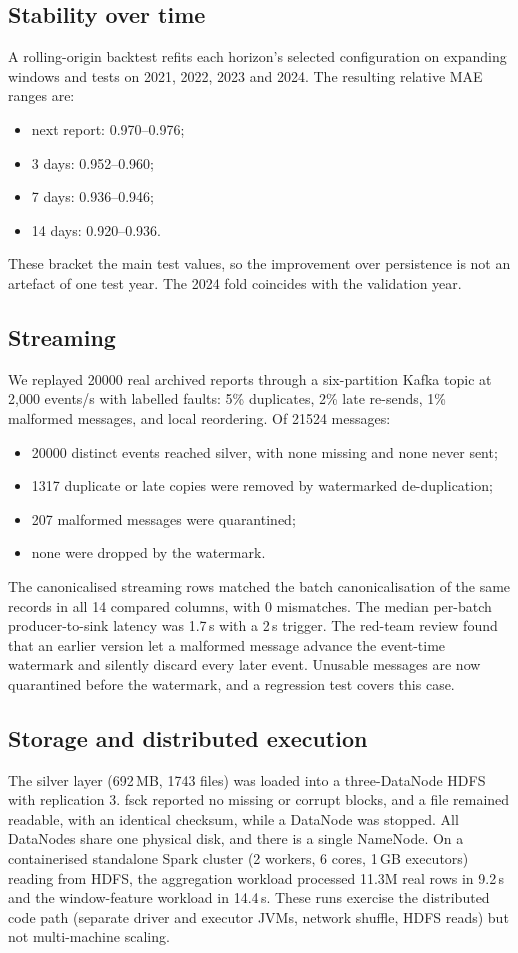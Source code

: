\subsection{Stability over time}\label{sec:systemsresults}
A rolling-origin backtest refits each horizon's selected configuration on expanding windows and tests on 2021, 2022, 2023 and 2024.
The resulting relative MAE ranges are:
\begin{itemize}
  \item next report: 0.970--0.976;
  \item 3 days: 0.952--0.960;
  \item 7 days: 0.936--0.946;
  \item 14 days: 0.920--0.936.
\end{itemize}
These bracket the main test values, so the improvement over persistence is not an artefact of one test year.
The 2024 fold coincides with the validation year.

\subsection{Streaming}
We replayed \num{20000} real archived reports through a six-partition Kafka topic at 2,000 events/s with labelled faults: 5\% duplicates, 2\% late re-sends, 1\% malformed messages, and local reordering.
Of \num{21524} messages:
\begin{itemize}
  \item \num{20000} distinct events reached silver, with none missing and none never sent;
  \item \num{1317} duplicate or late copies were removed by watermarked de-duplication;
  \item 207 malformed messages were quarantined;
  \item none were dropped by the watermark.
\end{itemize}
The canonicalised streaming rows matched the batch canonicalisation of the same records in all 14 compared columns, with 0 mismatches.
The median per-batch producer-to-sink latency was 1.7\,s with a 2\,s trigger.
The red-team review found that an earlier version let a malformed message advance the event-time watermark and silently discard every later event. Unusable messages are now quarantined before the watermark, and a regression test covers this case.

\subsection{Storage and distributed execution}
The silver layer (692\,MB, \num{1743} files) was loaded into a three-DataNode HDFS with replication 3.
fsck reported no missing or corrupt blocks, and a file remained readable, with an identical checksum, while a DataNode was stopped.
All DataNodes share one physical disk, and there is a single NameNode.
On a containerised standalone Spark cluster (2 workers, 6 cores, 1\,GB executors) reading from HDFS, the aggregation workload processed 11.3M real rows in 9.2\,s and the window-feature workload in 14.4\,s.
These runs exercise the distributed code path (separate driver and executor JVMs, network shuffle, HDFS reads) but not multi-machine scaling.

